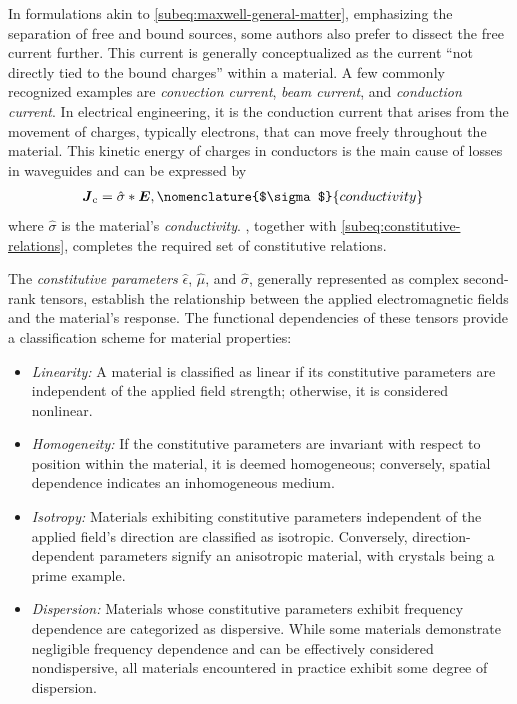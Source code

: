 \documentclass[11pt,a4paper,twoside,openany]{report}
\begin{document}
\begin{remark}
    In formulations akin to \cref{subeq:maxwell-general-matter}, emphasizing the separation of free and bound sources, some authors also prefer to dissect the free current further. This current is generally conceptualized as the current \enquote{not directly tied to the bound charges} within a material. A few commonly recognized examples are \emph{convection current}, \emph{beam current}, and \emph{conduction current}. In electrical engineering, it is the conduction current that arises from the movement of charges, typically electrons, that can move freely throughout the material. This kinetic energy of charges in conductors is the main cause of losses in waveguides and can be expressed by
    \begin{align}
        \label{eq:constitutive-relation-conductivity}
        \vec J_{\mathrm c} &= \hat\sigma \ast \vec E,
        \nomenclature{$\sigma$}{conductivity }%
    \end{align}
    where $\hat\sigma$ is the material's \emph{conductivity}. , together with \cref{subeq:constitutive-relations}, completes the required set of constitutive relations.
\end{remark}

The \emph{constitutive parameters} $\hat\epsilon$, $\hat\mu$, and $\hat\sigma$, generally represented as complex second-rank tensors, establish the relationship between the applied electromagnetic fields and the material's response. The functional dependencies of these tensors provide a classification scheme for material properties:
\begin{itemize}
    \item \emph{Linearity:} A material is classified as linear if its constitutive parameters are independent of the applied field strength; otherwise, it is considered nonlinear.
    \item \emph{Homogeneity:} If the constitutive parameters are invariant with respect to position within the material, it is deemed homogeneous; conversely, spatial dependence indicates an inhomogeneous medium.
    \item \emph{Isotropy:} Materials exhibiting constitutive parameters independent of the applied field's direction are classified as isotropic. Conversely, direction-dependent parameters signify an anisotropic material, with crystals being a prime example.
    \item \emph{Dispersion:} Materials whose constitutive parameters exhibit frequency dependence are categorized as dispersive. While some materials demonstrate negligible frequency dependence and can be effectively considered nondispersive, all materials encountered in practice exhibit some degree of dispersion.
\end{itemize}
\end{document}
